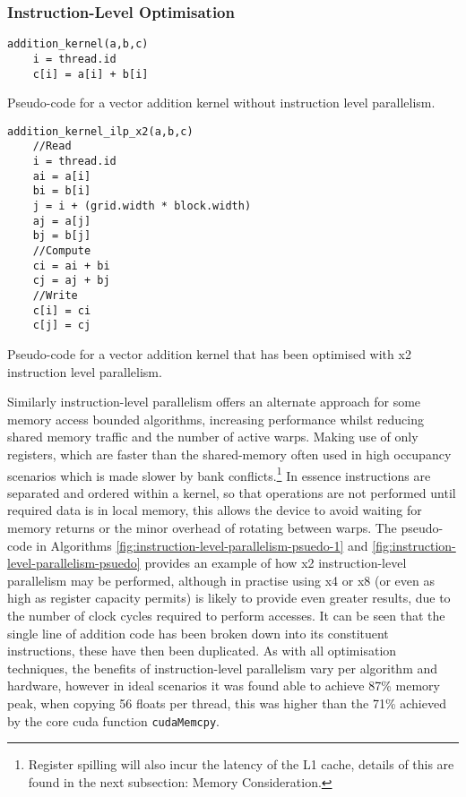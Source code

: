       \subsubsection*{Instruction-Level Optimisation}
\begin{algorithm}
\begin{lstlisting}
addition_kernel(a,b,c)
    i = thread.id
    c[i] = a[i] + b[i]
\end{lstlisting}
\protect\caption{\label{fig:instruction-level-parallelism-psuedo-1}Pseudo-code for a vector addition kernel without instruction level parallelism.}
\end{algorithm}

\begin{algorithm}
\begin{lstlisting}
addition_kernel_ilp_x2(a,b,c)
    //Read
    i = thread.id
    ai = a[i]
    bi = b[i]
    j = i + (grid.width * block.width)
    aj = a[j]
    bj = b[j]
    //Compute
    ci = ai + bi
    cj = aj + bj
    //Write
    c[i] = ci
    c[j] = cj
\end{lstlisting}
\protect\caption{\label{fig:instruction-level-parallelism-psuedo}Pseudo-code for a vector addition kernel that has been optimised with x2 instruction level parallelism. }
\end{algorithm}

        Similarly instruction-level parallelism offers an alternate approach for some memory access bounded algorithms, increasing performance whilst reducing shared memory traffic and the number of active warps. Making use of only registers, which are faster than the shared-memory often used in high occupancy scenarios which is made slower by bank conflicts.\footnote{Register spilling will also incur the latency of the L1 cache, details of this are found in the next subsection: Memory Consideration.} In essence instructions are separated and ordered within a kernel, so that operations are not performed until required data is in local memory, this allows the device to avoid waiting for memory returns or the minor overhead of rotating between warps. The pseudo-code in Algorithms \ref{fig:instruction-level-parallelism-psuedo-1} and \ref{fig:instruction-level-parallelism-psuedo} provides an example of how x2 instruction-level parallelism may be performed, although in practise using x4 or x8 (or even as high as register capacity permits) is likely to provide even greater results, due to the number of clock cycles required to perform accesses. It can be seen that the single line of addition code has been broken down into its constituent instructions, these have then been duplicated. As with all optimisation techniques, the benefits of instruction-level parallelism vary per algorithm and hardware, however in ideal scenarios it was found able to achieve 87\% memory peak, when copying 56 floats per thread, this was higher than the 71\% achieved by the core \gls{cuda} function \lstinline!cudaMemcpy!. \cite{VV10} 
        
